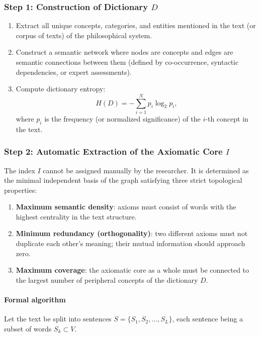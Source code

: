 \documentclass[12pt,a4paper]{article}
\begin{document}
	\subsubsection{Step 1: Construction of Dictionary \(D\)}
	
	\begin{enumerate}
		\item Extract all unique concepts, categories, and entities mentioned in the text (or corpus of texts) of the philosophical system.
		\item Construct a semantic network where nodes are concepts and edges are semantic connections between them (defined by co-occurrence, syntactic dependencies, or expert assessments).
		\item Compute dictionary entropy:
		\[
		H(D) = -\sum_{i=1}^{N} p_i \log_2 p_i,
		\]
		where \(p_i\) is the frequency (or normalized significance) of the \(i\)-th concept in the text.
	\end{enumerate}
	
	\subsubsection{Step 2: Automatic Extraction of the Axiomatic Core \(I\)}
	\label{sec:auto-basis}
	
	The index \(I\) cannot be assigned manually by the researcher. It is determined as the minimal independent basis of the graph satisfying three strict topological properties:
	\begin{enumerate}
		\item \textbf{Maximum semantic density}: axioms must consist of words with the highest centrality in the text structure.
		\item \textbf{Minimum redundancy (orthogonality)}: two different axioms must not duplicate each other's meaning; their mutual information should approach zero.
		\item \textbf{Maximum coverage}: the axiomatic core as a whole must be connected to the largest number of peripheral concepts of the dictionary \(D\).
	\end{enumerate}
	
	\paragraph{Formal algorithm}
	Let the text be split into sentences \(S = \{S_1, S_2, \dots, S_L\}\), each sentence being a subset of words \(S_k \subset V\).
	
\end{document}
